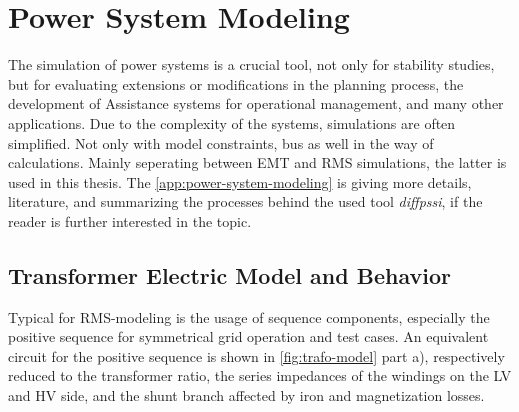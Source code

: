 \section{Power System Modeling}

The simulation of power systems is a crucial tool, not only for stability studies, but for evaluating extensions or modifications in the planning process, the development of Assistance systems for operational management, and many other applications. \quelle Due to the complexity of the systems, simulations are often simplified. Not only with model constraints, bus as well in the way of calculations. Mainly seperating between \acf{EMT} and \acf{RMS} simulations, the latter is used in this thesis. The \autoref{app:power-system-modeling} is giving more details, literature, and summarizing the processes behind the used tool \textit{diffpssi}, if the reader is further interested in the topic.

\subsection{Transformer Electric Model and Behavior}


Typical for \acs{RMS}-modeling is the usage of sequence components, especially the positive sequence for symmetrical grid operation and test cases. \quelle An equivalent circuit for the positive sequence is shown in \autoref{fig:trafo-model} part a), respectively reduced to the transformer ratio, the series impedances of the windings on the \acs{LV} and \acs{HV} side, and the shunt branch affected by iron and magnetization losses. \autocite{machowskiPowerSystemDynamics2020,kundurPowerSystemStability2022,milanoPowerSystemModelling2010}

